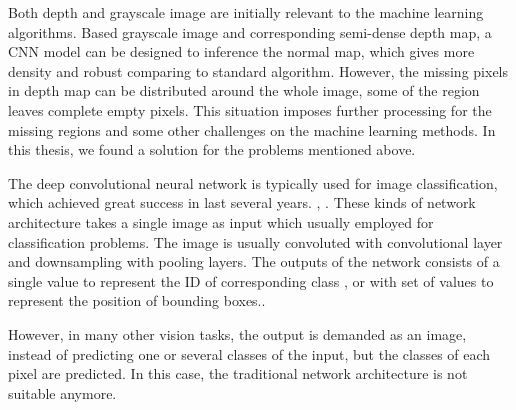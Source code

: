Both depth and grayscale image are initially relevant to the machine learning algorithms. Based grayscale image and corresponding semi-dense depth map, a CNN model can be designed to inference the normal map, which gives more density and robust comparing to standard algorithm. However, the missing pixels in depth map can be distributed around the whole image, some of the region leaves complete empty pixels. This situation imposes further processing for the missing regions and some other challenges on the machine learning methods. 
In this thesis, we found a solution for the problems mentioned above.

The deep convolutional neural network is typically used for image classification, which achieved great success in last several years. \cite{yolov3}, \cite{efficientDet}. 
These kinds of network architecture takes a single image as input which usually employed for classification problems. The image is usually convoluted with convolutional layer and downsampling with pooling layers. The outputs of the network consists of a single value to represent the ID of corresponding class \cite{efficientDet}, or with set of values to represent the position of bounding boxes.\cite{yolov3}.


However, in many other vision tasks, the output is demanded as an image, instead of predicting one or several classes of the input, but the classes of each pixel are predicted. In this case, the traditional network architecture is not suitable anymore.

